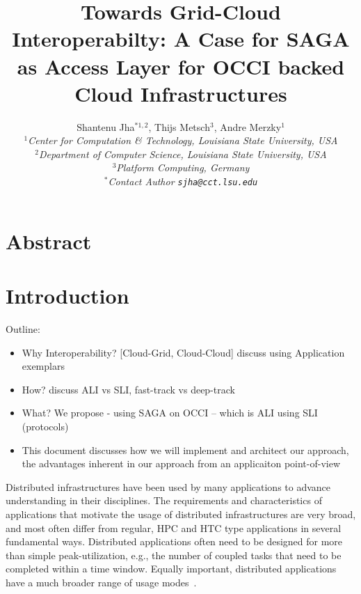 \documentclass[10pt,conference,final,letterpaper,twoside,twocolumn,]{IEEEtran}
\begin{document}
\title{Towards Grid-Cloud Interoperabilty: A Case for SAGA as Access
  Layer for OCCI backed Cloud Infrastructures}

\author{Shantenu Jha$^{*1,2}$, Thijs Metsch$^{3}$, Andre Merzky$^{1}$\\
  \small{\emph{$^{1}$Center for Computation \& Technology, Louisiana State University, USA}}\\
  \small{\emph{$^{2}$Department of Computer Science, Louisiana State University, USA}}\\
  \small{\emph{$^{3}$Platform Computing, Germany}}\\
  \small{\emph{$^{*}$Contact Author \texttt{sjha@cct.lsu.edu}}}
  }


\maketitle

\section*{Abstract}


\section{Introduction}
\label{sec:intro}
 

Outline:
\begin{itemize}
\item Why Interoperability? [Cloud-Grid, Cloud-Cloud] discuss using
  Application exemplars
\item How? discuss ALI vs SLI, fast-track vs deep-track
\item What? We propose - using SAGA on OCCI -- which is ALI using SLI
  (protocols)
\item This document discusses how we will implement and architect our
  approach, the advantages inherent in our approach from an
  applicaiton point-of-view
\end{itemize}



 Distributed infrastructures have been used by many applications to
 advance understanding in their disciplines.  The requirements and
 characteristics of applications that motivate the usage of
 distributed infrastructures are very broad, and most often differ
 from regular, HPC and HTC type applications in several fundamental
 ways.  Distributed applications often need to be designed for more
 than simple peak-utilization, e.g., the number of coupled tasks that
 need to be completed within a time window.  Equally important,
 distributed applications have a much broader range of usage
 modes~\cite{dpa-paper}.
\end{document}
